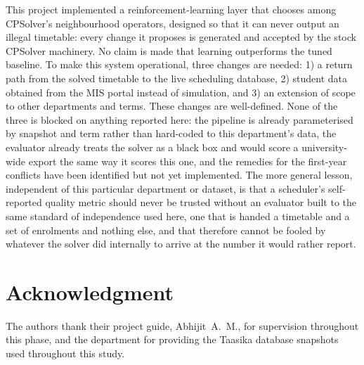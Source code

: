 \documentclass[journal]{IEEEtran}
\begin{document}
This project implemented a reinforcement-learning layer that chooses among CPSolver's neighbourhood operators, designed so that it can never output an illegal timetable: every change it proposes is generated and accepted by the stock CPSolver machinery. No claim is made that learning outperforms the tuned baseline. To make this system operational, three changes are needed: 1) a return path from the solved timetable to the live scheduling database, 2) student data obtained from the MIS portal instead of simulation, and 3) an extension of scope to other departments and terms. These changes are well-defined. None of the three is blocked on anything reported here: the pipeline is already parameterised by snapshot and term rather than hard-coded to this department's data, the evaluator already treats the solver as a black box and would score a university-wide export the same way it scores this one, and the remedies for the first-year conflicts have been identified but not yet implemented. The more general lesson, independent of this particular department or dataset, is that a scheduler's self-reported quality metric should never be trusted without an evaluator built to the same standard of independence used here, one that is handed a timetable and a set of enrolments and nothing else, and that therefore cannot be fooled by whatever the solver did internally to arrive at the number it would rather report.

\section*{Acknowledgment}
The authors thank their project guide, Abhijit~A.~M., for supervision throughout this phase, and the department for providing the Taasika database snapshots used throughout this study.



\end{document}
